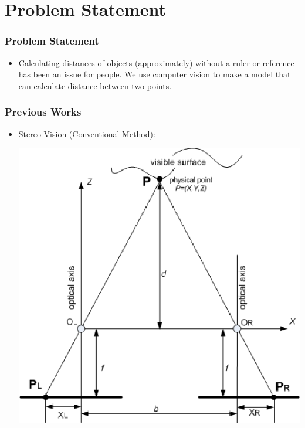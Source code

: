 \documentclass{beamer}
\begin{document}
	\section{Problem Statement}
	\begin{frame}
	\frametitle{Problem Statement}
	
	\begin{itemize}
		\item Calculating distances of objects (approximately) without a ruler or reference has been an issue for people. We use computer vision to make a model that can calculate distance between two points.
	\end{itemize}
	
	\end{frame}
	\begin{frame}
	\frametitle{Previous Works}
	\begin{itemize}
		
		\item Stereo Vision (Conventional Method): \\
		\begin{center}
			\includegraphics[height=0.5\textheight]{imgs/stereo.png}
		\end{center}
	\end{itemize}
	\end{frame}
	
\end{document}
